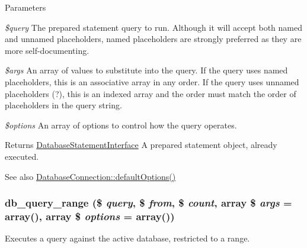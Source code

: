 \begin{DoxyParams}{Parameters}
\item[{\em \$query}]The prepared statement query to run. Although it will accept both named and unnamed placeholders, named placeholders are strongly preferred as they are more self-\/documenting. \item[{\em \$args}]An array of values to substitute into the query. If the query uses named placeholders, this is an associative array in any order. If the query uses unnamed placeholders (?), this is an indexed array and the order must match the order of placeholders in the query string. \item[{\em \$options}]An array of options to control how the query operates.\end{DoxyParams}
\begin{DoxyReturn}{Returns}
\hyperlink{interfaceDatabaseStatementInterface}{DatabaseStatementInterface} A prepared statement object, already executed.
\end{DoxyReturn}
\begin{DoxySeeAlso}{See also}
\hyperlink{classDatabaseConnection_a190539d6c494ef2d7ac90d21226de5a5}{DatabaseConnection::defaultOptions()} 
\end{DoxySeeAlso}
\hypertarget{group__database_gadd8bfb4984a4c69ac741b2bb20d6b9bf}{
\subsubsection[{db\_\-query\_\-range}]{\setlength{\rightskip}{0pt plus 5cm}db\_\-query\_\-range (\$ {\em query}, \/  \$ {\em from}, \/  \$ {\em count}, \/  array \$ {\em args} = {\ttfamily array()}, \/  array \$ {\em options} = {\ttfamily array()})}}
\label{group__database_gadd8bfb4984a4c69ac741b2bb20d6b9bf}
Executes a query against the active database, restricted to a range.


